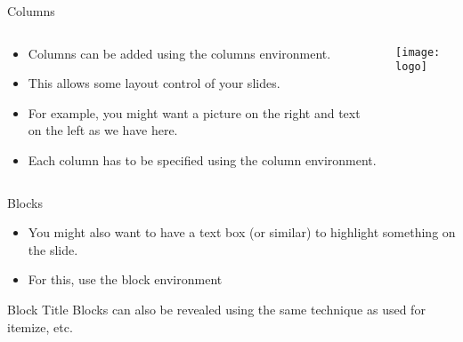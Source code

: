 \documentclass{beamer} %
\begin{document}
    \begin{frame}{Columns}
        \begin{columns}
            \begin{column}{.5\textwidth}
                \begin{itemize}
                    \item Columns can be added using the columns environment.
                    \item This allows some layout control of your slides.
                    \item For example, you might want a picture on the right and text on the left as we have here.
                    \item Each column has to be specified using the column environment.
                \end{itemize}
            \end{column}
            \begin{column}{.5\textwidth}
                \texttt{[image: logo]}
            \end{column}
        \end{columns}
    \end{frame}
    
    \begin{frame}{Blocks}
        \begin{itemize}
            \item You might also want to have a text box (or similar) to highlight something on the slide.
            \item For this, use the block environment
        \end{itemize}
        \begin{block}{Block Title}
            Blocks can also be revealed using the same technique as used for itemize, etc.
        \end{block}
    \end{frame}
\end{document}
